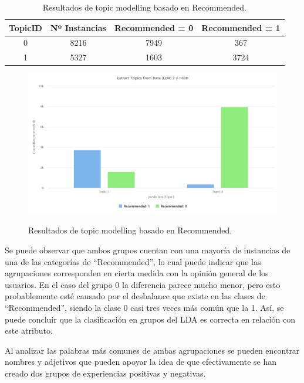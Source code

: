 \documentclass[es]{uc3mreport}
\begin{document}
\begin{report}
\begin{table}[H]
\center
\begin{tabular}{@{}cccc@{}}
    \toprule
    TopicID & Nº Instancias & Recommended = 0 & Recommended = 1 \\
    \midrule
    0       & 8216          & 7949            & 367 \\
    1       & 5327          & 1603            & 3724\\
    \bottomrule
\end{tabular}
\caption{Resultados de topic modelling basado en Recommended.}
\end{table}

\begin{figure}[H]
    \center
    \includegraphics[width=0.85\linewidth]{graph_2topic_1000iter_other.jpeg}\\
    \caption{Resultados de topic modelling basado en Recommended.}
\end{figure}

Se puede observar que ambos grupos cuentan con una mayoría de instancias de una
de las categorías de “Recommended”, lo cual puede indicar que las agrupaciones
corresponden en cierta medida con la opinión general de los usuarios. En el
caso del grupo 0 la diferencia parece mucho menor, pero esto probablemente esté
causado por el desbalance que existe en las clases de “Recommended”, siendo la
clase 0 casi tres veces más común que la 1. Así, se puede concluir que la
clasificación en grupos del LDA es correcta en relación con este atributo.

Al analizar las palabras más comunes de ambas agrupaciones se pueden encontrar
nombres y adjetivos que pueden apoyar la idea de que efectivamente se han
creado dos grupos de experiencias positivas y negativas.


\end{report}
\end{document}
